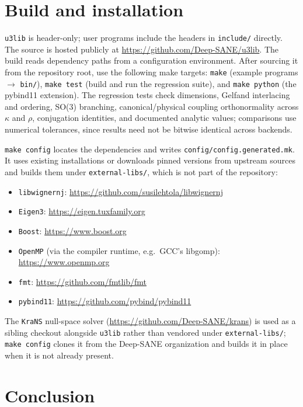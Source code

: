 \documentclass[aps,onecolumn,10pt,superscriptaddress,floatfix,nofootinbib]{revtex4}
\begin{document}
\section{Build and installation}
\label{sec:build}

\texttt{u3lib} is header-only; user programs include the headers in \verb|include/|
directly. The source is hosted publicly at
\url{https://github.com/Deep-SANE/u3lib}.
The build reads dependency paths from a configuration environment. After
sourcing it from the repository root, use the following make targets: \verb|make| (example programs $\to$ \verb|bin/|), \verb|make test|
(build and run the regression suite), and \verb|make python| (the pybind11
extension). The regression tests check dimensions, Gelfand interlacing and
ordering, SO(3) branching, canonical/physical coupling orthonormality across
$\kappa$ and $\rho$, conjugation identities, and documented analytic values;
comparisons use numerical tolerances, since results need not be bitwise
identical across backends.

\verb|make config| locates the dependencies and writes
\verb|config/config.generated.mk|. It uses existing installations or downloads
pinned versions from upstream sources and builds them under
\verb|external-libs/|, which is not part of the repository:
\begin{itemize}
    \item \texttt{libwignernj}: \url{https://github.com/susilehtola/libwignernj} %
    \item \texttt{Eigen3}: \url{https://eigen.tuxfamily.org}
    \item \texttt{Boost}: \url{https://www.boost.org}
    \item \texttt{OpenMP} (via the compiler runtime, e.g.\ GCC's libgomp): \url{https://www.openmp.org}
    \item \texttt{fmt}: \url{https://github.com/fmtlib/fmt}
    \item \texttt{pybind11}: \url{https://github.com/pybind/pybind11}
\end{itemize}

The \texttt{KraNS} null-space solver (\url{https://github.com/Deep-SANE/krans})
is used as a sibling checkout alongside \texttt{u3lib} rather than vendored under
\verb|external-libs/|; \verb|make config| clones it from the Deep-SANE
organization and builds it in place when it is not already present. 

\section{Conclusion}
\label{sec:conclusion}
\end{document}
